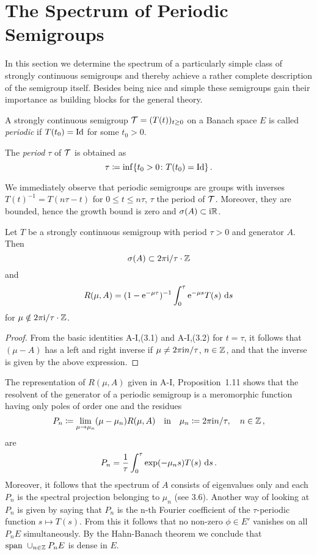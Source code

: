 \section{The Spectrum of Periodic Semigroups}\label{sec:a3-5}
In this section we determine the spectrum of a particularly simple class of strongly continuous semigroups and thereby achieve a rather complete description of the semigroup itself.
Besides being nice and simple these semigroups gain their importance as building blocks for the general theory.
\begin{definition}\label{def:a3-5.1}
A strongly continuous semigroup $\mathcal{T} = (T(t))_{t \geq 0}$ on a Banach space $E$ is called \emph{periodic} if $T(t_{0}) = \operatorname{Id}$ for some $t_{0} > 0$.

The \emph{period} $\tau$ of $\mathcal{T}$ is obtained as 
%
\[
	\tau \coloneqq \inf\{t_{0} > 0 \colon T(t_{0}) = \operatorname{Id}\}\,.
\]
%
\end{definition}
We immediately observe that periodic semigroups are groups with inverses $T(t)^{-1} = T(n\tau-t)$ for $0 \leq t \leq n\tau$, $\tau$ the period of $\mathcal{T}$.
Moreover, they are bounded, hence the growth bound is zero and $\sigma(A) \subset \mathrm{i}\mathbb{R}$.
\begin{lemma}\label{lem:a3-5.2}
Let $T$ be a strongly continuous semigroup with period $\tau > 0$ and generator $A$.
Then
\[
\sigma(A) \subset 2\pi \mathrm{i}/\tau\cdot\mathbb{Z}
\]
and
\begin{equation}\label{eq:a3-5.1}
R(\mu,A) = (1-\mathrm{e}^{-\mu\tau})^{-1} \int_{0}^{\tau}\mathrm{e}^{-\mu s}T(s) \, \mathop{}\!\mathrm{d}{s}
\end{equation}
for $\mu \notin 2\pi\mathrm{i} /\tau\cdot\mathbb{Z}$.
\end{lemma}
\begin{proof}
From the basic identities A-I,(3.1) and A-I,(3.2) for $t = \tau$, it follows that $(\mu - A)$ has a left and right inverse if $\mu \neq 2\pi\mathrm{i} n/\tau$, $n \in \mathbb{Z}$, and that the inverse is given by the above expression.
\end{proof}
The representation of $R(\mu,A)$ given in A-I, Proposition~1.11 shows that the resolvent of the generator of a periodic semigroup is a meromorphic function having only poles of order one and the residues
\[
P_{n} \coloneqq \lim_{\mu \to \mu_{n}} (\mu-\mu_{n})R(\mu,A) \quad \text{in} \quad \mu_{n} \coloneqq 2\pi\mathrm{i} n/\tau, \quad n \in \mathbb{Z}\,,
\]
are
\begin{equation}\label{eq:a3-5.2}
P_{n} = \frac{1}{\tau}\int_{0}^{\tau}\exp(-\mu_{n}s)T(s) \, \mathop{}\!\mathrm{d}{s}\,.
\end{equation}
Moreover, it follows that the spectrum of $A$ consists of eigenvalues only and each $P_{n}$ is the spectral projection belonging to $\mu_{n}$ (see 3.6). 
Another way of looking at $P_{n}$ is given by saying that $P_{n}$ is the n-th Fourier coefficient of the $\tau$-periodic function $s \mapsto T(s)$.
From this it follows that no non-zero $\phi \in E'$ vanishes on all $P_{n}E$ simultaneously.
By the Hahn-Banach theorem we conclude that $\text{span } \cup_{n \in \mathbb{Z}} P_{n}E$ is dense in $E$.

